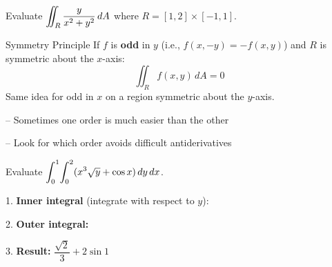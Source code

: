 \documentclass[11pt]{article}
\begin{document}
\begin{example}
Evaluate $\displaystyle\iint_R \frac{y}{x^2+y^2}\,dA$ where $R = [1,2]\times[-1,1]$.

\end{example}

\begin{formulabox}{Symmetry Principle}
If $f$ is \textbf{odd} in $y$ (i.e., $f(x,-y) = -f(x,y)$) and $R$ is symmetric about the $x$-axis:
\[\iint_R f(x,y)\,dA = 0\]
Same idea for odd in $x$ on a region symmetric about the $y$-axis.
\end{formulabox}


-- Sometimes one order is much easier than the other

-- Look for which order avoids difficult antiderivatives

\begin{example}
Evaluate $\displaystyle\int_0^1\!\int_0^2 (x^3\sqrt{y} + \cos x)\,dy\,dx$.

1. \textbf{Inner integral} (integrate with respect to $y$):


2. \textbf{Outer integral:}


3. \textbf{Result:} $\boxed{\dfrac{\sqrt{2}}{3} + 2\sin 1}$
\end{example}

\end{document}
